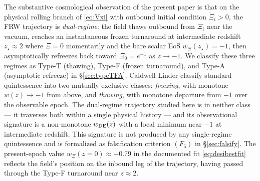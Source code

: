 \documentclass[11pt,reqno]{amsart}
\theoremstyle{plain}
\theoremstyle{definition}
\theoremstyle{remark}
\begin{document}
The substantive cosmological observation of the present paper is that on
the physical rolling branch of \eqref{eq:Vxi} with outbound initial
condition $\dot\Xi_i > 0$, the FRW trajectory is \emph{dual-regime}: the
field thaws outbound from $\Xi_i$ near the vacuum, reaches an
instantaneous frozen turnaround at intermediate redshift $z_\star
\approx 2$ where $\dot\Xi = 0$ momentarily and the bare scalar EoS
$w_\Xi(z_\star) = -1$, then asymptotically refreezes back toward
$\Xi_0 = e^{-1}$ as $z \to -1$. We classify these three regimes as
Type-T (thawing), Type-F (frozen turnaround), and Type-A (asymptotic
refreeze) in \S\ref{sec:typeTFA}. Caldwell-Linder
\cite{CaldwellLinder2005} classify standard quintessence into two
mutually exclusive classes: \emph{freezing}, with monotone $w(z) \to -1$
from above, and \emph{thawing}, with monotone departure from $-1$ over
the observable epoch. The dual-regime trajectory studied here is in
neither class --- it traverses both within a single physical history
--- and its observational signature is a non-monotone $w_{\rm DE}(z)$
with a local minimum near $-1$ at intermediate redshift. This signature
is not produced by any single-regime quintessence and is formalized as
falsification criterion $(F_5)$ in \S\ref{sec:falsify}. The
present-epoch value $w_\Xi(z=0) \approx -0.79$ in the documented fit
\eqref{eq:desibestfit} reflects the field's position on the inbound leg
of the trajectory, having passed through the Type-F turnaround near
$z \approx 2$.
\end{document}
